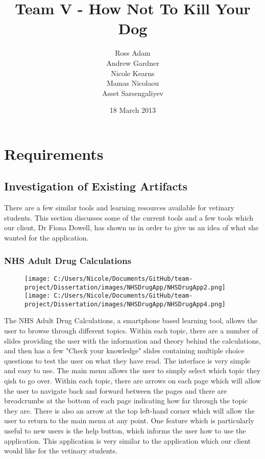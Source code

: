 \documentclass{l3proj}
\begin{document}
\title{Team V - How Not To Kill Your Dog}
\author{Ross Adam \\
        Andrew Gardner \\
        Nicole Kearns \\
        Mamas Nicolaou \\
        Asset Sarsengaliyev}
\date{18 March 2013}
\maketitle

\chapter{Requirements}
\label{req}

\section{Investigation of Existing Artifacts}

There are a few similar tools and learning resources available for vetinary students. This section discusses some of the current tools and a few tools which our client, Dr Fiona Dowell, has shown us in order to give us an idea of what she wanted for the application.

\subsection{NHS Adult Drug Calculations}

\begin{figure}[!htb]
  \texttt{[image: C:/Users/Nicole/Documents/GitHub/team-project/Dissertation/images/NHSDrugApp/NHSDrugApp2.png]}
\endminipage\hfill
{}
  \texttt{[image: C:/Users/Nicole/Documents/GitHub/team-project/Dissertation/images/NHSDrugApp/NHSDrugApp4.png]}
\endminipage
\end{figure}


The NHS Adult Drug Calculations, a smartphone based learning tool, allows the user to browse through different topics. Within each topic, there are a number of slides providing the user with the information and theory behind the calculations, and then has a few "Check your knowledge" slides containing multiple choice questions to test the user on what they have read. The interface is very simple and easy to use. The main menu allows the user to simply select which topic they qish to go over. Within each topic, there are arrows on each page which will allow the user to navigate back and forward between the pages and there are breadcrumbs at the bottom of each page indicating how far through the topic they are.  There is also an arrow at the top left-hand corner which will allow the user to return to the main menu at any point. One feature which is particularly useful to new users is the help button, which informs the user how to use the application. This application is very similar to the application which our client would like for the vetinary students.
\end{document}
